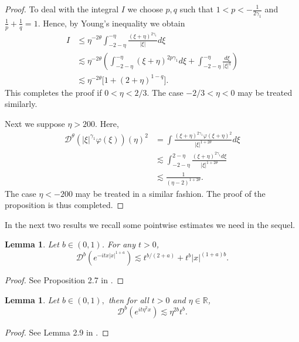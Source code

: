 \documentclass[reqno]{amsart}
\newcommand{\les}{\lesssim}
\newcommand{\R}{\mathbb R}
\numberwithin{equation}{section}
\newtheorem{lemma}[theorem]{Lemma}
\begin{document}
\begin{proof}
To deal with the integral $I$ we  choose $p,q$ such that $1<p<-\frac{1}{2\gamma_1}$ and $
\frac{1}{p}+\frac{1}{q}=1$.
Hence, by  Young's inequality we obtain
\begin{equation*}
	\begin{split}
	 I
	&\leq \eta^{-2\theta}\int_{-2-\eta}^{-\eta}\frac{(\xi+\eta)^{2\gamma_1}}{|\xi|}d\xi\\
	&\les \eta^{-2\theta}\left(\int_{-2-\eta}^{-\eta}(\xi+\eta)^{2p\gamma_1}d\xi+\int_{-2-\eta}^{-\eta}\frac{d\xi}{|\xi|^q}\right)\\
&\les \eta^{-2\theta}\big[1+(2+\eta)^{1-q}\big].
	\end{split}
	\end{equation*}
This completes the proof if $0<\eta<2/3$.	The case $-2/3<\eta<0$ may be treated similarly. 
	
	Next we suppose $\eta>200$. Here,
	\begin{equation}
	\begin{split}
	\mathcal{D}^\theta (|\xi|^{\gamma_1}\varphi(\xi))(\eta)^2&=\int \frac{(\xi+\eta)^{2\gamma_1}\varphi(\xi+\eta)^2}{|\xi|^{1+2\theta}}d\xi\\
	&\les \int_{-2-\eta}^{2-\eta}\frac{(\xi+\eta)^{2\gamma_1} d\xi}{|\xi|^{1+2\theta}}\\
	&\les \frac{1}{(\eta-2)^{1+2\theta}}.
	\end{split}
	\end{equation}
	The case $\eta<-200$ may be treated in a similar fashion. The proof of the proposition is thus completed.
\end{proof}


In the next two results we recall some pointwise estimates we need in the sequel.


\begin{lemma}\label{Pontual1}
Let $b\in (0,1)$. For any $t>0$,
\begin{equation*}
\mathcal{D}^{b}(e^{-itx|x|^{1+a}})\les t^{b/(2+a)}+t^{b}|x|^{(1+a)b}.
\end{equation*}
\end{lemma}
\begin{proof}
See Proposition 2.7 in \cite{FLP1}.
\end{proof}


\begin{lemma}\label{P}
Let $b\in (0,1),$ then for all $t>0$ and $\eta\in \R$,
$$
\mathcal{D}^{b}(e^{it\eta^{2}x})\les\eta^{2b}t^{b}.
$$
\end{lemma}
\begin{proof}
	See Lemma 2.9 in \cite{AP}.
\end{proof}
\end{document}
